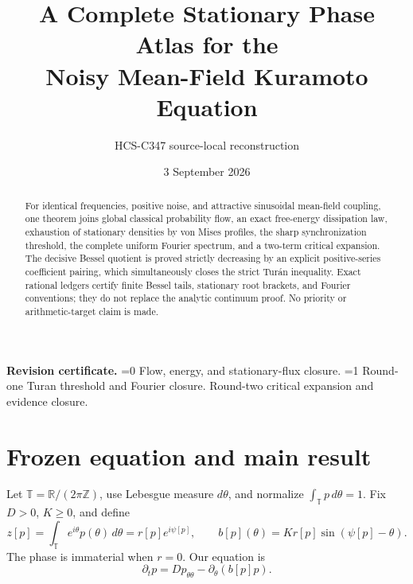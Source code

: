 \documentclass[10pt]{article}
\title{A Complete Stationary Phase Atlas for the\\
Noisy Mean-Field Kuramoto Equation}
\author{HCS-C347 source-local reconstruction}
\date{3 September 2026}
\providecommand{\CRevisionRound}{2}
\theoremstyle{remark}
\newcommand{\Torus}{\mathbb T}
\begin{document}
\maketitle

\begin{abstract}
For identical frequencies, positive noise, and attractive sinusoidal
mean-field coupling, one theorem joins global classical probability flow,
an exact free-energy dissipation law, exhaustion of stationary densities by
von Mises profiles, the sharp synchronization threshold, the complete
uniform Fourier spectrum, and a two-term critical expansion.  The decisive
Bessel quotient is proved strictly decreasing by an explicit positive-series
coefficient pairing, which simultaneously closes the strict Tur\'an
inequality.  Exact rational ledgers certify finite Bessel tails, stationary
root brackets, and Fourier conventions; they do not replace the analytic
continuum proof.  No priority or arithmetic-target claim is made.
\end{abstract}

\noindent\textbf{Revision certificate.}
\ifnum\CRevisionRound=0
Flow, energy, and stationary-flux closure.
\else\ifnum\CRevisionRound=1
Round-one Turan threshold and Fourier closure.
\else
Round-two critical expansion and evidence closure.
\fi\fi
\small

\section{Frozen equation and main result}

Let \(\Torus=\mathbb R/(2\pi\mathbb Z)\), use Lebesgue measure
\(d\theta\), and normalize \(\int_{\Torus}p\,d\theta=1\).  Fix
\(D>0\), \(K\geq0\), and define
\[
 z[p]=\int_{\Torus}e^{i\theta}p(\theta)\,d\theta
      =r[p]e^{i\psi[p]},\qquad
 b[p](\theta)=Kr[p]\sin(\psi[p]-\theta).
\]
The phase is immaterial when \(r=0\).  Our equation is
\begin{equation}
 \partial_t p=Dp_{\theta\theta}-\partial_\theta(b[p]p).
 \label{eq:pde}
\end{equation}
\end{document}
